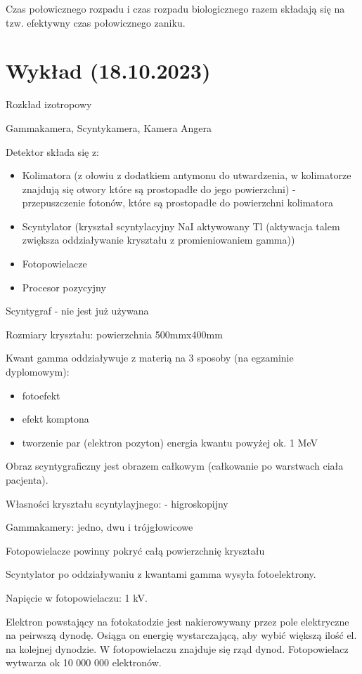 \documentclass{article}
\begin{document}
Czas połowicznego rozpadu i czas rozpadu biologicznego razem składają się na tzw. efektywny czas połowicznego zaniku.

\section{Wykład (18.10.2023)}

Rozkład izotropowy

Gammakamera, Scyntykamera, Kamera Angera

Detektor składa się z:
\begin{itemize}
    \item Kolimatora (z ołowiu z dodatkiem antymonu do utwardzenia, w kolimatorze znajdują się otwory które są prostopadłe do jego powierzchni) - przepuszczenie fotonów, które są prostopadłe do powierzchni kolimatora
    \item Scyntylator (kryształ scyntylacyjny NaI aktywowany Tl (aktywacja talem zwiększa oddziaływanie kryształu z promieniowaniem gamma))
    \item Fotopowielacze
    \item Procesor pozycyjny
\end{itemize}

Scyntygraf - nie jest już używana

Rozmiary kryształu: powierzchnia 500mmx400mm

Kwant gamma oddziaływuje z materią na 3 sposoby (na egzaminie dyplomowym):
\begin{itemize}
    \item fotoefekt
    \item efekt komptona
    \item tworzenie par (elektron pozyton) energia kwantu powyżej ok. 1 MeV
\end{itemize}

Obraz scyntygraficzny jest obrazem całkowym (całkowanie po warstwach ciała pacjenta).

Własności kryształu scyntylayjnego:
- higroskopijny

Gammakamery: jedno, dwu i trójgłowicowe

Fotopowielacze powinny pokryć całą powierzchnię kryształu

Scyntylator po oddziaływaniu z kwantami gamma wysyła fotoelektrony.

Napięcie w fotopowielaczu: 1 kV.

Elektron powstający na fotokatodzie jest nakierowywany przez pole elektryczne na peirwszą dynodę. Osiąga on energię wystarczającą, aby wybić większą ilość el. na kolejnej dynodzie. W fotopowielaczu znajduje się rząd dynod.
Fotopowielacz wytwarza ok 10 000 000 elektronów.
\end{document}
